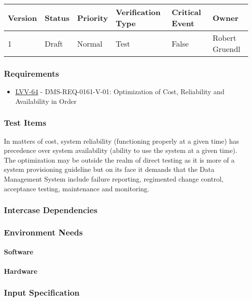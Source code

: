 \begin{longtable}[]{llllll}
\toprule
Version & Status & Priority & Verification Type & Critical Event & Owner
\\\midrule
1 & Draft & Normal &
Test & False & Robert Gruendl
\\\bottomrule
\end{longtable}

\subsubsection{Requirements}
\begin{itemize}
\item \href{https://jira.lsstcorp.org/browse/LVV-64}{LVV-64} - DMS-REQ-0161-V-01: Optimization of Cost, Reliability and Availability in Order
\end{itemize}

\subsubsection{Test Items}
In matters of cost, system reliability (functioning properly at a given
time) has precedence over system availability (ability to use the system
at a given time). ~ The optimization may be outside the realm of direct
testing as it is more of a system provisioning guideline but on its face
it demands that the Data Management System include failure reporting,
regimented change control, acceptance testing, maintenance and
monitoring.



\subsubsection{Intercase Dependencies}

\subsubsection{Environment Needs}

\paragraph{Software}

\paragraph{Hardware}

\subsubsection{Input Specification}

